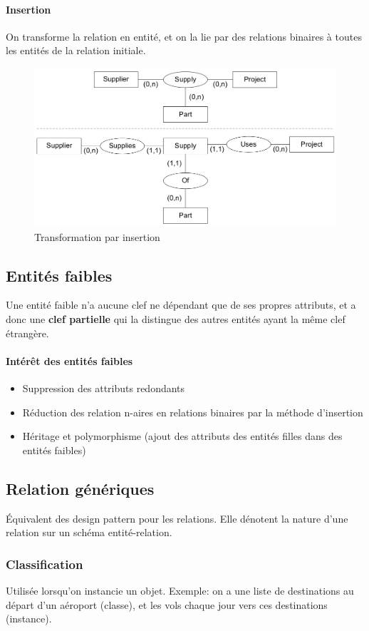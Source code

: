 \documentclass[a4paper]{article}
\begin{document}
\paragraph{Insertion}
On transforme la relation en entité, et on la lie par des relations binaires à
toutes les entités de la relation initiale.
\begin{figure}[h!]
    \center
    \includegraphics[width=.6\textwidth]{fig/relation-naire-insertion.png}
    \caption{Transformation par insertion}
\end{figure}

\subsection{Entités faibles}
Une entité faible n'a aucune clef ne dépendant que de ses propres attributs, et
a donc une \textbf{clef partielle} qui la distingue des autres entités ayant la
même clef étrangère.

\paragraph{Intérêt des entités faibles}
\begin{itemize}
  \item Suppression des attributs redondants
  \item Réduction des relation n-aires en relations binaires par la méthode d'insertion
  \item Héritage et polymorphisme (ajout des attributs des entités filles dans des entités faibles)
\end{itemize}

\subsection{Relation génériques}
\'Equivalent des design pattern pour les relations. Elle dénotent la nature d'une
relation sur un schéma entité-relation.

\subsubsection{Classification}
Utilisée lorsqu'on instancie un objet. Exemple: on a une liste de destinations
au départ d'un aéroport (classe), et les vols chaque jour vers ces destinations (instance).
\end{document}

